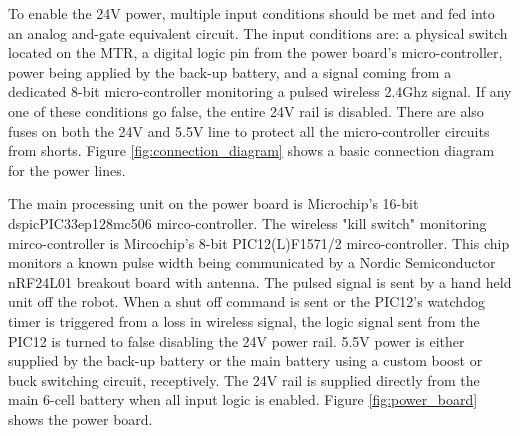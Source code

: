To enable the 24V power, multiple input conditions should be met and fed into an analog and-gate equivalent circuit.
The input conditions are: a physical switch located on the MTR, a digital logic pin from the power board's micro-controller, power being applied by the back-up battery, and a signal coming from a dedicated 8-bit micro-controller monitoring a pulsed wireless 2.4Ghz signal.
If any one of these conditions go false, the entire 24V rail is disabled.
There are also fuses on both the 24V and 5.5V line to protect all the micro-controller circuits from shorts.
Figure \ref{fig:connection_diagram} shows a basic connection diagram for the power lines.

The main processing unit on the power board is Microchip's 16-bit dspicPIC33ep128mc506 mirco-controller.
The wireless "kill switch" monitoring mirco-controller is Mircochip's 8-bit PIC12(L)F1571/2 mirco-controller.
This chip monitors a known pulse width being communicated by a Nordic Semiconductor nRF24L01 breakout board with antenna.
The pulsed signal is sent by a hand held unit off the robot.
When a shut off command is sent or the PIC12's watchdog timer is triggered from a loss in wireless signal, the logic signal sent from the PIC12 is turned to false disabling the 24V power rail. 
5.5V power is either supplied by the back-up battery or the main battery using a custom boost or buck switching circuit, receptively.
The 24V rail is supplied directly from the main 6-cell battery when all input logic is enabled.
Figure \ref{fig:power_board} shows the power board. 

